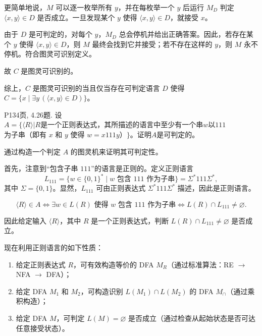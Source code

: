\documentclass[11pt,addpoints,answers]{exam}
\begin{document}
\begin{questions}
\begin{solution}
        更简单地说，$M$ 可以逐一枚举所有 $y$，并在每枚举一个 $y$ 后运行 $M_D$ 判定 $\langle x, y \rangle \in D$ 是否成立。一旦发现某个 $y$ 使得 $\langle x, y \rangle \in D$，就接受 $x$。
        
        由于 $D$ 是可判定的，对每个 $y$，$M_D$ 总会停机并给出正确答案。因此，若存在某个 $y$ 使得 $\langle x, y \rangle \in D$，则 $M$ 最终会找到它并接受；若不存在这样的 $y$，则 $M$ 永不停机。符合图灵可识别定义。
        
        故 $C$ 是图灵可识别的。
        
        \medskip
        
        综上，$C$ 是图灵可识别的当且仅当存在可判定语言 $D$ 使得 $C = \{ x \mid \exists y\, (\langle x, y \rangle \in D) \}$。
	\end{solution}
	
	\question P134页, 4.26题.
	设$A=\{\langle R
	\rangle|R \text{是一个正则表达式，其所描述的语言中至少有一个串}w\text{以}111$ $\text{为子串（即有 } x\text{ 和 }y\text{ 使得 }w=x111y\text{）}\}$。证明$A$是可判定的。
	
	\begin{solution}
        通过构造一个判定 $A$ 的图灵机来证明其可判定性。

        首先，注意到“包含子串 $111$”的语言是正则的。定义正则语言
        \[
        L_{111} = \{ w \in \{0,1\}^* \mid w \text{ 包含 } 111 \text{ 作为子串} \} = \Sigma^* 111 \Sigma^*,
        \]
        其中 $\Sigma = \{0,1\}$。显然，$L_{111}$ 可由正则表达式 $\Sigma^*111\Sigma^*$ 描述，因此是正则语言。

        \[
        \langle R \rangle \in A \iff \exists w \in L(R) \text{ 使得 } w \text{ 包含 } 111 \text{ 作为子串}
        \iff L(R) \cap L_{111} \neq \varnothing.
        \]
        
        因此给定输入 $\langle R \rangle$，其中 $R$ 是一个正则表达式，判断 $L(R) \cap L_{111} \neq \varnothing$ 是否成立。  
        
        
        现在利用正则语言的如下性质：
        \begin{enumerate}
            \item 给定正则表达式 $R$，可有效构造等价的 DFA $M_R$（通过标准算法：RE $\to$ NFA $\to$ DFA）；
            \item 给定 DFA $M_1$ 和 $M_2$，可构造识别 $L(M_1) \cap L(M_2)$ 的 DFA $M_\cap$（通过乘积构造）；
            \item 给定 DFA $M$，可判定 $L(M) = \varnothing$ 是否成立（通过检查从起始状态是否可达任意接受状态）。
        \end{enumerate}
        

\end{solution}
\end{questions}
\end{document}
